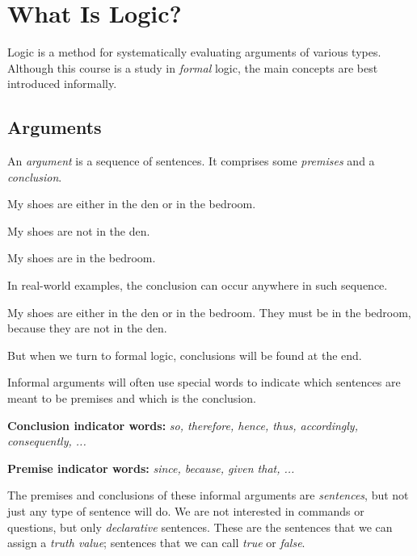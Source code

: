 \section{What Is Logic?}

Logic is a method for systematically evaluating arguments of various
types. Although this course is a study in \textit{formal} logic, the
main concepts are best introduced informally.

\subsection{Arguments} \cite[][Chapter 1, pp. 2-6]{Mag25}

An \textit{argument} is a sequence of sentences. It comprises some
\textit{premises} and a \textit{conclusion}.

\begin{argument}
\item[] My shoes are either in the den or in the bedroom.
\item[] My shoes are not in the den.
\item[\therefore] My shoes are in the bedroom.
\end{argument}

In real-world examples, the conclusion can occur anywhere in such sequence.

\begin{argument}
\item[] My shoes are either in the den or in the bedroom. They must be in
  the bedroom, because they are not in the den.
\end{argument}

But when we turn to formal logic, conclusions will be found at the end.

Informal arguments will often use special words to indicate which sentences
are meant to be premises and which is the conclusion.

\begin{argument}
\item[] \textbf{Conclusion indicator words:}
  \textit{so, therefore, hence, thus, accordingly, consequently, ... }
\item[]  \textbf{Premise indicator words:}
  \textit{since, because, given that, ... }
\end{argument}

The premises and conclusions of these informal arguments are \textit{sentences},
but not just any type of sentence will do. We are not interested in commands or
questions, but only \textit{declarative} sentences. These are the sentences that
we can assign a \textit{truth value}; sentences that we can call \textit{true}
or \textit{false}.

